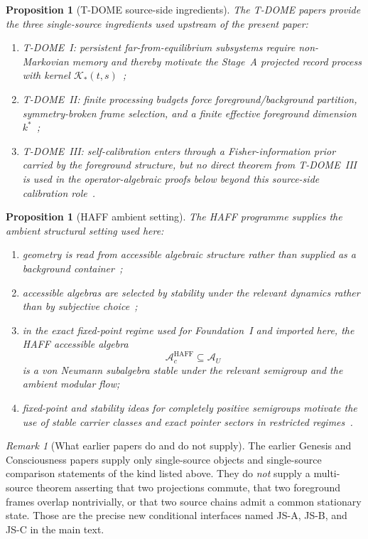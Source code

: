\documentclass[12pt]{article}
\newtheorem{proposition}[theorem]{Proposition}
\theoremstyle{definition}
\theoremstyle{remark}
\newtheorem{remark}[theorem]{Remark}
\begin{document}
\begin{proposition}[T-DOME source-side ingredients]
\label{prop:appTDOME}
The T-DOME papers provide the three single-source ingredients used
upstream of the present paper:
\begin{enumerate}
\item T-DOME~I: persistent far-from-equilibrium subsystems require
  non-Markovian memory and thereby motivate the Stage~A projected record
  process with kernel \(\mathcal K_*(t,s)\)~\cite{TDOMEI,BreuerPetruccione2002};
\item T-DOME~II: finite processing budgets force foreground/background
  partition, symmetry-broken frame selection, and a finite effective
  foreground dimension \(k^*\)~\cite{TDOMEII};
\item T-DOME~III: self-calibration enters through a Fisher-information
  prior carried by the foreground structure, but no direct theorem from
  T-DOME~III is used in the operator-algebraic proofs below beyond this
  source-side calibration role~\cite{TDOMEIII}.
\end{enumerate}
\end{proposition}

\begin{proposition}[HAFF ambient setting]
\label{prop:appHAFF}
The HAFF programme supplies the ambient structural setting used here:
\begin{enumerate}
\item geometry is read from accessible algebraic structure rather than
  supplied as a background container~\cite{HAFFA};
\item accessible algebras are selected by stability under the relevant
  dynamics rather than by subjective choice~\cite{HAFFD};
\item in the exact fixed-point regime used for Foundation~I and imported
  here, the HAFF accessible algebra
  \[
  \mathcal A_c^{\mathrm{HAFF}}\subseteq \mathcal A_U
  \]
  is a von Neumann subalgebra stable under the relevant semigroup and
  the ambient modular flow;
\item fixed-point and stability ideas for completely positive semigroups
  motivate the use of stable carrier classes and exact pointer sectors
  in restricted regimes~\cite{FrigerioVerri1982,Zurek2003}.
\end{enumerate}
\end{proposition}

\begin{remark}[What earlier papers do and do not supply]
The earlier Genesis and Consciousness papers supply only single-source
objects and single-source comparison statements of the kind listed above.
They do \emph{not} supply a multi-source theorem asserting that two
projections commute, that two foreground frames overlap nontrivially, or
that two source chains admit a common stationary state. Those are the
precise new conditional interfaces named JS-A, JS-B, and JS-C in the
main text.
\end{remark}
\end{document}
